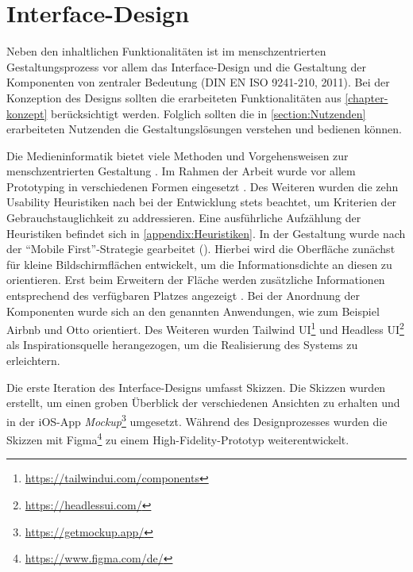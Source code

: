 \chapter{Interface-Design}
\label{chapter-design}
Neben den inhaltlichen Funktionalitäten ist im menschzentrierten
Gestaltungsprozess vor allem das Interface-Design und die Gestaltung der
Komponenten von zentraler Bedeutung \cite{DINISO9241} (DIN EN ISO 9241-210,
2011). Bei der Konzeption des Designs sollten die erarbeiteten Funktionalitäten
aus \ref{chapter-konzept} berücksichtigt werden. Folglich sollten die in
\ref{section:Nutzenden} erarbeiteten Nutzenden die Gestaltungslösungen verstehen
und bedienen können.

Die Medieninformatik bietet viele Methoden und Vorgehensweisen zur menschzentrierten Gestaltung
\cite{HerczegIDE2009}. Im Rahmen der Arbeit wurde vor allem Prototyping in verschiedenen Formen
eingesetzt \cite{HerczegMDI2009}. Des Weiteren wurden die zehn Usability Heuristiken nach
 bei der Entwicklung stets beachtet, um Kriterien der
Gebrauchstauglichkeit zu addressieren. Eine ausführliche Aufzählung der Heuristiken befindet sich in
\ref{appendix:Heuristiken}. In der Gestaltung wurde nach der \enquote{Mobile First}-Strategie
gearbeitet (). Hierbei wird die Oberfläche zunächst für kleine Bildschirmflächen
entwickelt, um die Informationsdichte an diesen zu orientieren. Erst beim Erweitern der Fläche
werden zusätzliche Informationen entsprechend des verfügbaren Platzes angezeigt
\cite{kim_chapter_2013}. Bei der Anordnung der Komponenten wurde sich an den
 genannten Anwendungen, wie zum Beispiel
Airbnb \cite{airbnb2022} und Otto \cite{otto2022}
orientiert. Des Weiteren wurden Tailwind UI\footnote{\url{https://tailwindui.com/components}} und
Headless UI\footnote{\url{https://headlessui.com/}} als Inspirationsquelle herangezogen, um die
Realisierung des Systems zu erleichtern.

Die erste Iteration des Interface-Designs umfasst Skizzen. Die Skizzen wurden
erstellt, um einen groben Überblick der verschiedenen Ansichten zu erhalten und
in der iOS-App \textit{Mockup}\footnote{\url{https://getmockup.app/}} umgesetzt. Während des
Designprozesses wurden die Skizzen mit
Figma\footnote{\url{https://www.figma.com/de/}} zu einem High-Fidelity-Prototyp
weiterentwickelt.

